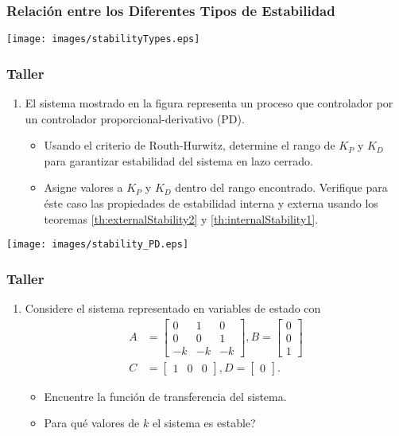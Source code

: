 \documentclass[aspectratio=169]{beamer}
\theoremstyle{definition}
\theoremstyle{plain}
\theoremstyle{remark}
\newcounter{saveenumi}
\newcommand{\seti}{\setcounter{saveenumi}{\value{enumi}}}
\newcommand{\conti}{\setcounter{enumi}{\value{saveenumi}}}
\begin{document}
\begin{frame}[<-+>]\frametitle{Relación entre los Diferentes Tipos de Estabilidad}
\centering
\vspace*{5mm}
\texttt{[image: images/stabilityTypes.eps]}
\end{frame}

\begin{frame}\frametitle{Taller}
\begin{enumerate}
  \conti
  \item El sistema mostrado en la figura representa un proceso que controlador por un controlador proporcional-derivativo (PD).
  \begin{itemize}
  	\item Usando el criterio de Routh-Hurwitz, determine el rango de $K_P$ y $K_D$ para garantizar estabilidad del sistema en lazo cerrado.
  	\item Asigne valores a $K_P$ y $K_D$ dentro del rango encontrado. Verifique para éste caso las propiedades de estabilidad interna y externa usando los teoremas \ref{th:externalStability2} y \ref{th:internalStability1}.
  \end{itemize}
  \seti
\end{enumerate}
\begin{center}
  \texttt{[image: images/stability\_PD.eps]}
\end{center}
\end{frame}

\begin{frame}\frametitle{Taller}
\begin{enumerate}
  \conti
  \item Considere el sistema representado en variables de estado con
  \begin{align*}
  	A &= 
  	\begin{bmatrix}
  		0  &  1 &  0\\
  		0  &  0 &  1\\
  		-k & -k & -k
  	\end{bmatrix},
  	B = 
  	\begin{bmatrix}
  		0 \\ 0 \\ 1
  	\end{bmatrix}\\
  	C &=
  	\begin{bmatrix}
  		1 & 0 & 0
  	\end{bmatrix}, 
  	D =
  	\begin{bmatrix}
  		0
  	\end{bmatrix}.
  \end{align*}
  \begin{itemize}
  	\item Encuentre la función de transferencia del sistema.
  	\item Para qué valores de $k$ el sistema es estable?
  \end{itemize}
  \seti
\end{enumerate}
\end{frame}
\end{document}
